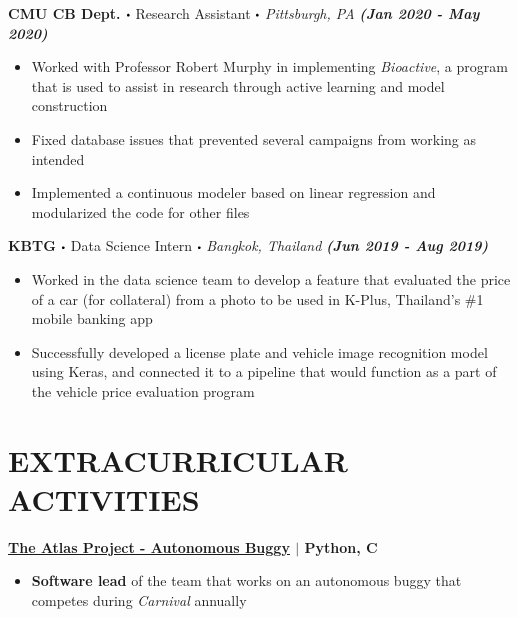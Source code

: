 \documentclass[10pt]{article}
\newcommand\sbullet[1][.5]{\mathbin{\vcenter{\hbox{\scalebox{#1}{$\bullet$}}}}}
\newcommand{\CC}{C\nolinebreak\hspace{-.05em}\raisebox{.4ex}{\tiny\bf +}\nolinebreak\hspace{-.10em}\raisebox{.4ex}{\tiny\bf +}}
\begin{document}

  \textbf{\large CMU CB Dept. $\sbullet$} {\large Research Assistant $\sbullet$ \textit{Pittsburgh, PA} \hfill \textit{\textbf{(Jan 2020 - May 2020)}}}

  \vspace*{-0.2cm}
  \begin{itemize}
    \itemsep-0.4em
    \item \textcolor{lighterG}{Worked with Professor Robert Murphy in implementing \textit{Bioactive}, a program that is used to assist in research through active learning and model construction}
    \item \textcolor{lighterG}{Fixed database issues that prevented several campaigns from working as intended}
    \item \textcolor{lighterG}{Implemented a continuous modeler based on linear regression and modularized the code for other files}
  \end{itemize}

  \textbf{\large KBTG $\sbullet$} {\large Data Science Intern $\sbullet$ \textit{Bangkok, Thailand} \hfill \textit{\textbf{(Jun 2019 - Aug 2019)}}}

  \vspace*{-0.2cm}
  \begin{itemize}
    \itemsep-0.4em
    \item \textcolor{lighterG}{Worked in the data science team to develop a feature that evaluated the price of a car (for collateral) from a photo to be used in K-Plus, Thailand's \#1 mobile banking app}
    \item \textcolor{lighterG}{Successfully developed a license plate and vehicle image recognition model using Keras, and connected it to a pipeline that would function as a part of the vehicle price evaluation program}
  \end{itemize}

  \section*{\large \textcolor{lighterB}{EXTRACURRICULAR ACTIVITIES}}
  \vspace*{-0.23cm}

  \textbf{\large \href{https://sites.google.com/view/atlasbuggy/}{The Atlas Project - Autonomous Buggy} $\mid$ Python, \CC} 
  \vspace*{-0.17cm}
  \begin{itemize}
    \itemsep0em
    \item \textcolor{lighterG}{\textbf{Software lead} of the team that works on an autonomous buggy that competes during \textit{Carnival} annually}
  \end{itemize}
\end{document}
